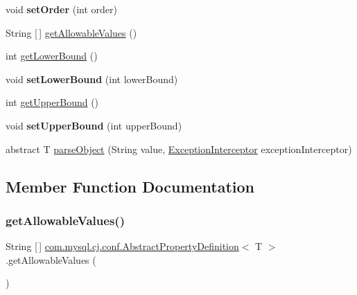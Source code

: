 \begin{DoxyCompactItemize}
void {\bfseries set\+Order} (int order)
\item 
String \mbox{[}$\,$\mbox{]} \mbox{\hyperlink{classcom_1_1mysql_1_1cj_1_1conf_1_1_abstract_property_definition_a3dc8d82d1870d9a7ad201b6552f77610}{get\+Allowable\+Values}} ()
\item 
int \mbox{\hyperlink{classcom_1_1mysql_1_1cj_1_1conf_1_1_abstract_property_definition_a834649a1010def340ecfda489b8e4c86}{get\+Lower\+Bound}} ()
\item 
\mbox{\label{classcom_1_1mysql_1_1cj_1_1conf_1_1_abstract_property_definition_a95fd17b674eed162f64c336c6cdf9474}} 
void {\bfseries set\+Lower\+Bound} (int lower\+Bound)
\item 
int \mbox{\hyperlink{classcom_1_1mysql_1_1cj_1_1conf_1_1_abstract_property_definition_ad5fda7a2939d0525ae139dcb9489a100}{get\+Upper\+Bound}} ()
\item 
\mbox{\label{classcom_1_1mysql_1_1cj_1_1conf_1_1_abstract_property_definition_ab4baaef262eb2d3218853f84be8ce87b}} 
void {\bfseries set\+Upper\+Bound} (int upper\+Bound)
\item 
abstract T \mbox{\hyperlink{classcom_1_1mysql_1_1cj_1_1conf_1_1_abstract_property_definition_aa8a990e4882d80051332cacda3886747}{parse\+Object}} (String value, \mbox{\hyperlink{interfacecom_1_1mysql_1_1cj_1_1exceptions_1_1_exception_interceptor}{Exception\+Interceptor}} exception\+Interceptor)
\end{DoxyCompactItemize}


\subsection{Member Function Documentation}
\mbox{\label{classcom_1_1mysql_1_1cj_1_1conf_1_1_abstract_property_definition_a3dc8d82d1870d9a7ad201b6552f77610}} 
\subsubsection{\texorpdfstring{get\+Allowable\+Values()}{getAllowableValues()}}
{\footnotesize\ttfamily String \mbox{[}$\,$\mbox{]} \mbox{\hyperlink{classcom_1_1mysql_1_1cj_1_1conf_1_1_abstract_property_definition}{com.\+mysql.\+cj.\+conf.\+Abstract\+Property\+Definition}}$<$ T $>$.get\+Allowable\+Values (\begin{DoxyParamCaption}{ }\end{DoxyParamCaption})}

